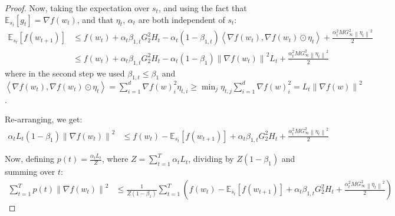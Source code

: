 \documentclass{article}
\newcommand{\norm}[1]{\left\lVert{#1}\right\rVert}
\newcommand{\currw}{w_t}
\newcommand{\nextw}{w_{t+1}}
\newcommand{\w}{w}
\newcommand{\currg}{g_t}
\newcommand{\curre}{\eta_t}
\newcommand{\currei}{\eta_{t,i}}
\newcommand{\curra}{\alpha_t}
\newcommand{\normed}[1]{\left\lVert {#1} \right\rVert}
\newcommand{\bone}{\beta_1}
\newcommand{\bonet}{\beta_{1,t}}
\newcommand{\smooth}{M}
\newcommand{\lowinft}{L_{t}}
\newcommand{\highinft}{H_{t}}
\newcommand{\gradb}{G_\infty}
\newcommand{\gradbtwo}{G_2}
\newcommand{\expec}[2]{\mathbb E_{#1} \left[ {#2} \right]}
\begin{document}
\begin{proof}
Now, taking the expectation over $s_t$, and using the fact that $\expec{s_t}{\currg} = \nabla f(\currw)$, and that $\curre$, $\curra$ are both independent of $s_t$:
\begin{equation}
\begin{split}
   \expec{s_t}{f(\nextw)}
   &\leq f(\currw) + \curra \bonet \gradbtwo^2 \highinft - \curra (1 - \bonet) \left\langle \nabla f(\currw), \nabla f(\currw) \odot \curre \right\rangle + \frac{\curra^2 \smooth \gradb^2 \norm{\curre}^2}2 \\
   &\leq f(\currw) + \curra \bonet \gradbtwo^2 \highinft - \curra (1 - \bone) \normed{\nabla f(\currw)}^2 \lowinft + \frac{\curra^2 \smooth \gradb^2 \norm{\curre}^2}2
\end{split}
\end{equation}
where in the second step we used
$\bonet \leq \bone$ and
$\left\langle \nabla f(\currw), \nabla f(\currw) \odot \curre \right\rangle = \sum_{i=1}^d \nabla f(\w)_i^2 \currei \geq \min_j \eta_{t,j} \sum_{i=1}^d \nabla f(\w)_i^2 = \lowinft \normed{\nabla f(\w)}^2$.

Re-arranging, we get:
\begin{equation}
\begin{split}
   \curra \lowinft (1 - \bone) \normed{\nabla f(\currw)}^2 & \leq f(\currw) -  \expec{s_t}{f(\nextw)} + \curra \bonet \gradbtwo^2 \highinft + \frac{\curra^2 \smooth \gradb^2 \norm{\curre}^2}2
\end{split}
\label{eq:proof-inter}
\end{equation}

Now, defining
   $p(t) = \frac{\curra \lowinft}Z$, where $Z = \sum_{t=1}^T \curra \lowinft$, dividing by $Z (1 - \bone)$ and summing over $t$:
\begin{equation}
\begin{split}
   \sum_{t=1}^T p(t) \normed{\nabla f(\currw)}^2 & \leq \frac1{Z(1-\bone)} \sum_{t=1}^T  \left( f(\currw) - \expec{s_t}{f(\nextw)} + \curra \bonet \gradbtwo^2 \highinft + \frac{\curra^2 \smooth \gradb^2 \norm{\curre}^2}2 \right)
\end{split}
\end{equation}


\end{proof}
\end{document}
